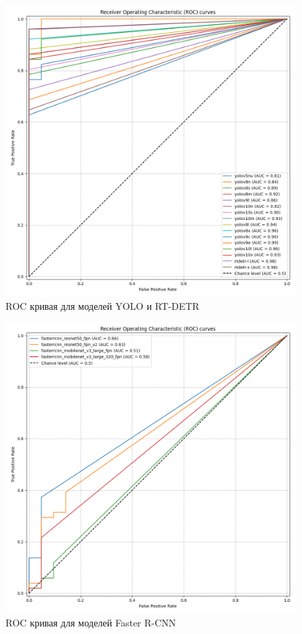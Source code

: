 \documentclass[../document.tex]{subfiles}
\begin{document}
 		\begin{figure}[H]
 			\centering
 			\includegraphics[scale=0.4]{roc_curve.png}
 			\caption{ROC кривая для моделей YOLO и RT-DETR}
 		\end{figure}
 		\begin{figure}[H]
 			\centering
 			\includegraphics[scale=0.4]{RCNN_roc_curve.png}
 			\caption{ROC кривая для моделей Faster R-CNN}
 		\end{figure}
\end{document}
